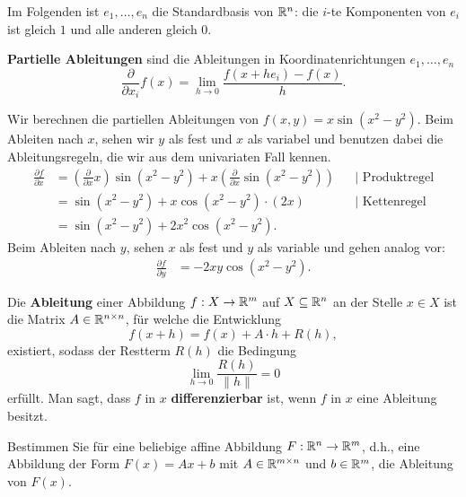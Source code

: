 \begin{bem}
	Im Folgenden ist $e_1,\ldots,e_n$ die Standardbasis von $\mathbb{R}^n$: die $i$-te Komponenten von $e_i$ ist gleich $1$ und alle anderen gleich $0$. 
\end{bem}


\begin{defn} 
	\textbf{Partielle Ableitungen} sind die Ableitungen in Koordinatenrichtungen $e_1,\ldots,e_n$ 
	\[
	\frac{\partial}{\partial x_i} f (x) = \lim_{h \to 0} \frac{f(x+ h e_i) - f(x)}{h}.
	\]
\end{defn} 

\begin{bsp}
	Wir berechnen die partiellen Ableitungen von $f(x,y) = x \sin(x^2-y^2)$. 
	Beim Ableiten nach $x$, sehen wir $y$ als fest und $x$ als variabel und benutzen dabei die Ableitungsregeln, die wir aus dem univariaten Fall kennen. 
	\begin{align*}
		\frac{\partial f}{\partial x} & =  \left( \frac{\partial}{\partial x} x \right) \sin(x^2-y^2)  + x 
		\left( \frac{\partial}{\partial x} \sin (x^2-y^2) \right) & & |\text{ Produktregel}
		\\ & = \sin(x^2-y^2) + x \cos(x^2 -  y^2) \cdot (2 x) & & |\text{ Kettenregel}
		\\ & = \sin(x^2 -y^2) + 2 x^2 \cos(x^2 - y^2). 
	\end{align*}
	Beim Ableiten nach $y$, sehen $x$ als fest und $y$ als variable und gehen analog vor: 
	\begin{align*}
		\frac{\partial f}{\partial y} & = - 2 x y \cos(x^2 - y^2). 
	\end{align*} 
\end{bsp} 

\begin{defn} 
	Die \textbf{Ableitung} einer Abbildung $f : X \to \mathbb{R}^m$ auf $X \subseteq \mathbb{R}^n$ an der Stelle $x \in X$ ist die Matrix $A \in \mathbb{R}^{n \times n}$, für welche die Entwicklung 
	\[
	f(x + h) = f(x) +  A \cdot h  + R(h),
	\]
	existiert, sodass der Restterm $R(h)$ die Bedingung 
	\[
	\lim_{h \to 0} \frac{R(h)}{\|h\|} = 0
	\]
	erfüllt. Man sagt, dass $f$ in $x$ \textbf{differenzierbar} ist, wenn $f$ in $x$ eine Ableitung besitzt. 
\end{defn} 

\begin{aufg}
	Bestimmen Sie für eine beliebige affine Abbildung $ F: \mathbb{R}^n \to \mathbb{R}^m$, d.h., eine Abbildung der Form $F(x) = A x + b$ mit $A \in \mathbb{R}^{m \times n}$ und $b \in \mathbb{R}^m$, die Ableitung von $F(x)$. 
\end{aufg} 

